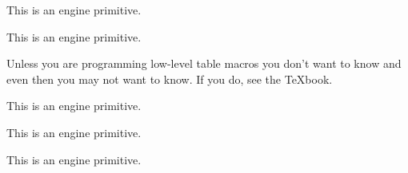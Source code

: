\begin{function}[]
  {
    \sp@ce@skip
  }
  \begin{syntax}
  \end{syntax}

\end{function}



\begin{function}[]
  {
    \sp@n
  }
  \begin{syntax}
  \end{syntax}

\end{function}



\begin{function}[]
  {
    \spacefactor
  }
  \begin{syntax}
  \end{syntax}
  This is an engine primitive.
\end{function}



\begin{function}[]
  {
    \spaceskip
  }
  \begin{syntax}
  \end{syntax}
  This is an engine primitive.
\end{function}



\begin{function}[int]
  {
    \span
  }
  \begin{syntax}
  \end{syntax}
  Unless you are programming low-level table macros you don't want to
  know and even then you may not want to know. If you do, see the
  \TeX{}book.

  This is an engine primitive.
\end{function}



\begin{function}[]
  {
    \special
  }
  \begin{syntax}
  \end{syntax}
  This is an engine primitive.
\end{function}



\begin{function}[]
  {
    \splitmaxdepth
  }
  \begin{syntax}
  \end{syntax}
  This is an engine primitive.
\end{function}



